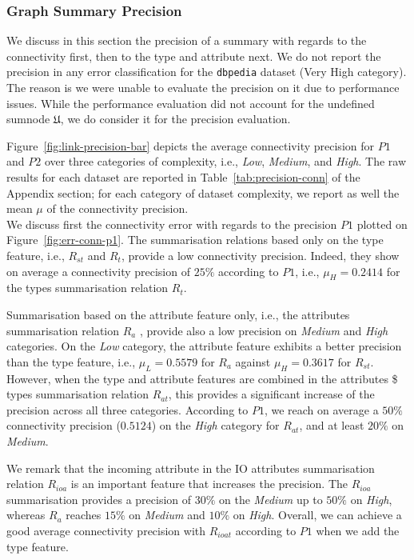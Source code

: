 

\subsubsection{Graph Summary Precision}

We discuss in this section the precision of a summary with regards to the connectivity first, then to the type and attribute next. We do not report the precision in any error classification for the \texttt{dbpedia} dataset (Very High category). The reason is we were unable to evaluate the precision on it due to performance issues. While the performance evaluation did not account for the undefined sumnode $\mathfrak{U}$, we do consider it for the precision evaluation.


Figure~\ref{fig:link-precision-bar} depicts the average connectivity precision for $P1$ and $P2$ over three categories of complexity, i.e., \emph{Low}, \emph{Medium}, and \emph{High}. The raw results for each dataset are reported in Table~\ref{tab:precision-conn} of the Appendix section; for each category of dataset complexity, we report as well the mean $\mu$ of the connectivity precision.\\

We discuss first the connectivity error with regards to the precision $P1$ plotted on Figure~\ref{fig:err-conn-p1}.
The summarisation relations based only on the type feature, i.e., $R_{st}$ and $R_t$, provide a low connectivity precision. Indeed, they show on average a connectivity precision of $25\%$ according to $P1$, i.e., $\mu_H=0.2414$ for the types summarisation relation $R_t$.

Summarisation based on the attribute feature only, i.e., the attributes summarisation relation $R_a$ , provide also a low precision on \emph{Medium} and \emph{High} categories. On the \emph{Low} category, the attribute feature exhibits a better precision than the type feature, i.e., $\mu_L=0.5579$ for $R_a$ against $\mu_H=0.3617$ for $R_{st}$. However, when the type and attribute features are combined in the attributes \$ types summarisation relation $R_{at}$, this provides a significant increase of the precision across all three categories. According to $P1$, we reach on average a $50\%$ connectivity precision ($0.5124$) on the \emph{High} category for $R_{at}$, and at least $20\%$ on \emph{Medium}.

We remark that the incoming attribute in the IO attributes summarisation relation $R_{ioa}$ is an important feature that increases the precision. The $R_{ioa}$ summarisation provides a precision of $30\%$ on the \emph{Medium} up to $50\%$ on \emph{High}, whereas $R_a$ reaches $15\%$ on \emph{Medium} and $10\%$ on \emph{High}. Overall, we can achieve a good average connectivity precision with $R_{ioat}$ according to $P1$ when we add the type feature.\\

